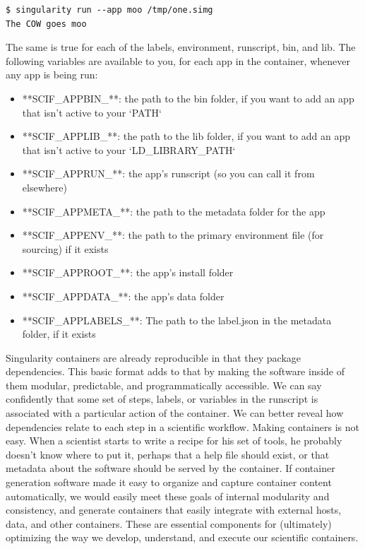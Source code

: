 \documentclass[a4paper]{article}
\begin{document}
\begin{lstlisting}[frame=single]  
$ singularity run --app moo /tmp/one.simg
The COW goes moo
\end{lstlisting}

The same is true for each of the labels, environment, runscript, bin, and lib. The following variables are available to you, for each app in the container, whenever any app is being run:\\[0.1in]

\begin{itemize}
\item **SCIF\_APPBIN\_**: the path to the bin folder, if you want to add an app that isn't active to your `PATH`
\item **SCIF\_APPLIB\_**: the path to the lib folder, if you want to add an app that isn't active to your `LD\_LIBRARY\_PATH`
\item **SCIF\_APPRUN\_**: the app's runscript (so you can call it from elsewhere)
\item **SCIF\_APPMETA\_**: the path to the metadata folder for the app
\item **SCIF\_APPENV\_**: the path to the primary environment file (for sourcing) if it exists
\item **SCIF\_APPROOT\_**: the app's install folder
\item **SCIF\_APPDATA\_**: the app's data folder
\item **SCIF\_APPLABELS\_**: The path to the label.json in the metadata folder, if it exists
\end{itemize}

Singularity containers are already reproducible in that they package dependencies. This basic format adds to that by making the software inside of them modular, predictable, and programmatically accessible. We can say confidently that some set of steps, labels, or variables in the runscript is associated with a particular action of the container. We can better reveal how dependencies relate to each step in a scientific workflow. Making containers is not easy. When a scientist starts to write a recipe for his set of tools, he probably doesn’t know where to put it, perhaps that a help file should exist, or that metadata about the software should be served by the container. If container generation software made it easy to organize and capture container content automatically, we would easily meet these goals of internal modularity and consistency, and generate containers that easily integrate with external hosts, data, and other containers. These are essential components for (ultimately) optimizing the way we develop, understand, and execute our scientific containers.
\end{document}
